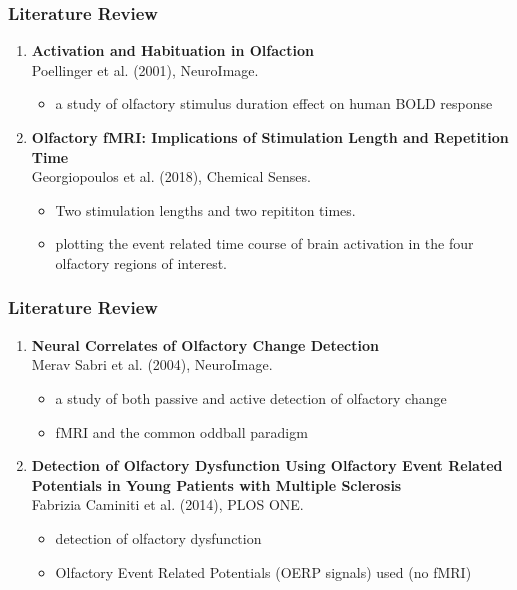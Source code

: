 \documentclass{beamer}
\newcounter{saveenumi}
\newcommand{\seti}{\setcounter{saveenumi}{\value{enumi}}}
\newcommand{\conti}{\setcounter{enumi}{\value{saveenumi}}}
\begin{document}
\begin{frame}
\frametitle{Literature Review}

\begin{enumerate}
	\item \textrm{\textbf{Activation and Habituation in Olfaction}}
	\\
	Poellinger et al. (2001), NeuroImage.\\
	\begin{itemize}
		\item
		a study of olfactory stimulus duration effect on human BOLD response
	\end{itemize}

	\item  \textrm{\textbf{Olfactory fMRI: Implications of Stimulation Length and Repetition Time}}\\
	Georgiopoulos et al. (2018), Chemical Senses.\\
	
	\begin{itemize}
		\item
		Two stimulation lengths and two repititon times.
		\item
		plotting the event related time course of brain activation in the four olfactory regions of interest. 
	\end{itemize}
	\seti
\end{enumerate}
	

	


\end{frame}


\begin{frame}
\frametitle{Literature Review}
\begin{enumerate}
	\conti
	\item \textrm{\textbf{Neural Correlates of Olfactory Change Detection}}
	\\
	Merav Sabri et al. (2004), NeuroImage.
	\begin{itemize}
		\item
		a study of both passive and active detection of olfactory change
		\item
		fMRI and the common oddball paradigm
	\end{itemize}
	\item \textrm{\textbf{Detection of Olfactory Dysfunction Using Olfactory Event
			Related Potentials in Young Patients with Multiple
			Sclerosis}}
	\\
	Fabrizia Caminiti et al. (2014), PLOS ONE.
	\begin{itemize}
		\item
		detection of olfactory dysfunction 
		\item
		Olfactory Event Related Potentials (OERP signals) used (no fMRI)
	\end{itemize}
	\seti
\end{enumerate}
\end{frame}
\end{document}

